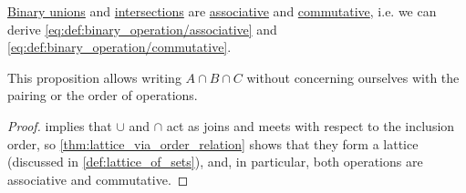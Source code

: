 \begin{corollary}\label{thm:binary_union_and_intersection_as_operations}
  \hyperref[def:set_union/binary]{Binary unions} and \hyperref[def:set_intersection/binary]{intersections} are \hyperref[def:binary_operation/associative]{associative} and \hyperref[def:binary_operation/commutative]{commutative}, i.e. we can derive \eqref{eq:def:binary_operation/associative} and \eqref{eq:def:binary_operation/commutative}.
\end{corollary}
\begin{comments}
  \item This proposition allows writing \( A \cap B \cap C \) without concerning ourselves with the pairing or the order of operations.
\end{comments}
\begin{proof}
   implies that \( {\cup} \) and \( {\cap} \) act as joins and meets with respect to the inclusion order, so \cref{thm:lattice_via_order_relation} shows that they form a lattice (discussed in \cref{def:lattice_of_sets}), and, in particular, both operations are associative and commutative.
\end{proof}

